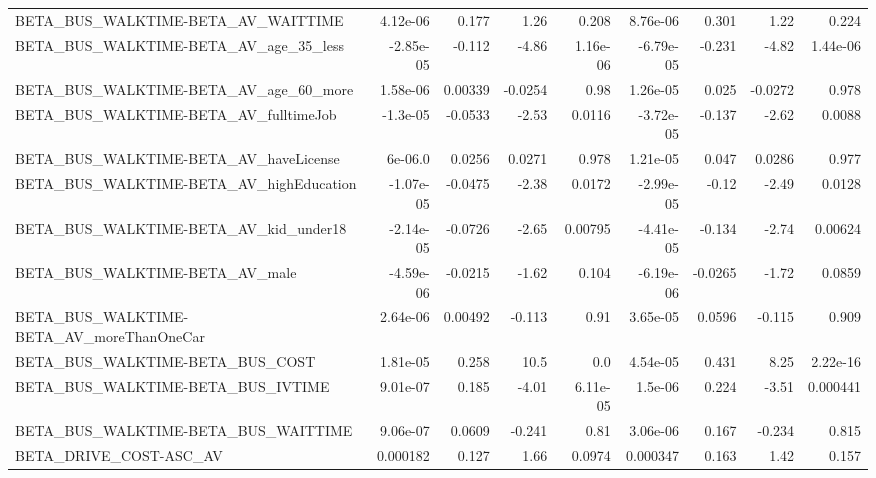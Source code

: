\begin{tabular}{lrrrrrrrr}
BETA\_BUS\_WALKTIME-BETA\_AV\_WAITTIME                 &    4.12e-06 &        0.177 &     1.26 &    0.208 &   8.76e-06 &       0.301 &         1.22 &         0.224 \\
BETA\_BUS\_WALKTIME-BETA\_AV\_age\_35\_less              &   -2.85e-05 &       -0.112 &    -4.86 & 1.16e-06 &  -6.79e-05 &      -0.231 &        -4.82 &      1.44e-06 \\
BETA\_BUS\_WALKTIME-BETA\_AV\_age\_60\_more              &    1.58e-06 &      0.00339 &  -0.0254 &     0.98 &   1.26e-05 &       0.025 &      -0.0272 &         0.978 \\
BETA\_BUS\_WALKTIME-BETA\_AV\_fulltimeJob              &    -1.3e-05 &      -0.0533 &    -2.53 &   0.0116 &  -3.72e-05 &      -0.137 &        -2.62 &        0.0088 \\
BETA\_BUS\_WALKTIME-BETA\_AV\_haveLicense              &     6e-06.0 &       0.0256 &   0.0271 &    0.978 &   1.21e-05 &       0.047 &       0.0286 &         0.977 \\
BETA\_BUS\_WALKTIME-BETA\_AV\_highEducation            &   -1.07e-05 &      -0.0475 &    -2.38 &   0.0172 &  -2.99e-05 &       -0.12 &        -2.49 &        0.0128 \\
BETA\_BUS\_WALKTIME-BETA\_AV\_kid\_under18              &   -2.14e-05 &      -0.0726 &    -2.65 &  0.00795 &  -4.41e-05 &      -0.134 &        -2.74 &       0.00624 \\
BETA\_BUS\_WALKTIME-BETA\_AV\_male                     &   -4.59e-06 &      -0.0215 &    -1.62 &    0.104 &  -6.19e-06 &     -0.0265 &        -1.72 &        0.0859 \\
BETA\_BUS\_WALKTIME-BETA\_AV\_moreThanOneCar           &    2.64e-06 &      0.00492 &   -0.113 &     0.91 &   3.65e-05 &      0.0596 &       -0.115 &         0.909 \\
BETA\_BUS\_WALKTIME-BETA\_BUS\_COST                    &    1.81e-05 &        0.258 &     10.5 &      0.0 &   4.54e-05 &       0.431 &         8.25 &      2.22e-16 \\
BETA\_BUS\_WALKTIME-BETA\_BUS\_IVTIME                  &    9.01e-07 &        0.185 &    -4.01 & 6.11e-05 &    1.5e-06 &       0.224 &        -3.51 &      0.000441 \\
BETA\_BUS\_WALKTIME-BETA\_BUS\_WAITTIME                &    9.06e-07 &       0.0609 &   -0.241 &     0.81 &   3.06e-06 &       0.167 &       -0.234 &         0.815 \\
BETA\_DRIVE\_COST-ASC\_AV                             &    0.000182 &        0.127 &     1.66 &   0.0974 &   0.000347 &       0.163 &         1.42 &         0.157 \\

\end{tabular}
